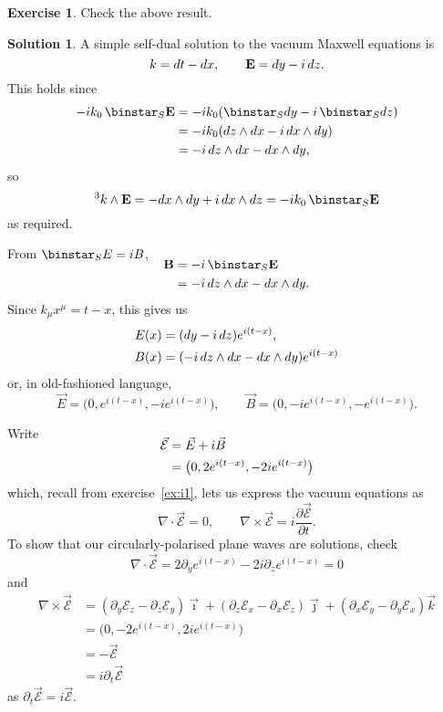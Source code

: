 \documentclass[11pt, a4paper]{report}
\theoremstyle{definition}
\newtheorem{exercise}{Exercise}[part]
\newtheorem{solution}{Solution}[part]
\newenvironment{ex}{\begin{exercise}}{\end{exercise}\pagebreak[1]}
\newenvironment{sol}{\begin{solution}}{\end{solution}\pagebreak[3]}
\renewcommand*{\d}{\ensuremath\mathop{}\mathopen{}d}
\renewcommand*{\star}{\ensuremath\mathop{}\mathopen\binstar\mathord{}}
\begin{document}
\begin{ex}

Check the above result.

\end{ex}

\begin{sol}

A simple self-dual solution to the vacuum Maxwell equations is
\[
    k = dt - dx, \qquad \mathbf{E} = dy - i \d z.
\]
This holds since
\begin{align*}
    -i k_0 \star_S \mathbf{E} &= -i k_0 (\star_S dy - i \star_S dz) \\
    &= -i k_0 (dz \wedge dx - i \d x \wedge dy) \\
    &= -i \d z \wedge dx - dx \wedge dy,
\end{align*}
so
\[
    ^3 k \wedge \mathbf{E} = -dx \wedge dy + i \d x \wedge dz = -ik_0 \star_S \mathbf{E}
\]
as required.

From $\star_S E = iB$,
\begin{align*}
    \SwapAboveDisplaySkip
    \mathbf{B} &= -i \star_S \mathbf{E} \\
               &= -i \d z \wedge dx - dx \wedge dy.
\end{align*}
Since $k_\mu x^\mu = t - x$, this gives us
\begin{align*}
    E(x) &= (dy - i \d z) e^{i (t - x)}, \\
    B(x) &= (-i \d z \wedge dx - dx \wedge dy) e^{i (t - x)}
\end{align*}
or, in old-fashioned language,
\[
    \vec{E} = \bigl( 0, e^{i(t - x)}, -ie^{i(t - x)} \bigr), \qquad
    \vec{B} = \bigl( 0, -i e^{i(t - x)}, -e^{i(t - x)} \bigr).
\]

Write
\begin{align*}
    \SwapAboveDisplaySkip
    \vec{\mathcal{E}} &= \vec{E} + i \vec{B} \\
                      &= \bigl( 0, 2 e^{i(t - x)}, -2 i e^{i(t - x)} \bigr)
\end{align*}
which, recall from exercise~\ref{ex:i1}, lets us express the vacuum equations as
\[
    \nabla \cdot \vec{\mathcal{E}} = 0, \qquad
    \nabla \times \vec{\mathcal{E}} = i \frac{\partial \vec{\mathcal{E}}}{\partial t}.
\]
To show that our circularly-polarised plane waves are solutions, check
\[
    \nabla \cdot \vec{\mathcal{E}} = 2 \partial_y e^{i(t - x)}
                                      -2 i \partial_z e^{i(t - x)}
                                   = 0
\]
and
\begin{align*}
    \nabla \times \vec{\mathcal{E}} &= (\partial_y \mathcal{E}_z - \partial_z \mathcal{E}_y) \vec{\imath}
            + (\partial_z \mathcal{E}_x - \partial_x \mathcal{E}_z) \vec{\jmath}
            + (\partial_x \mathcal{E}_y - \partial_y \mathcal{E}_x) \vec{k} \\
        &= \bigl( 0, -2 e^{i(t - x)}, 2 i e^{i(t - x)} \bigr) \\
        &= - \vec{\mathcal{E}} \\
        &= i \partial_t \vec{\mathcal{E}}
\end{align*}
as $\partial_t \vec{\mathcal{E}} = i \vec{\mathcal{E}}$.

\end{sol}
\end{document}

